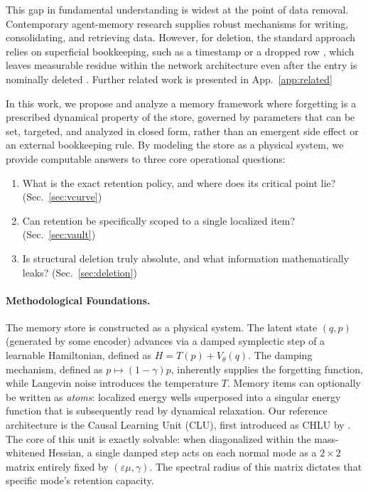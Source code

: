 \documentclass{article}
\begin{document}
This gap in fundamental understanding is widest at the point of data removal. Contemporary agent-memory research supplies robust mechanisms for writing, consolidating, and retrieving data. However, for deletion, the standard approach relies on superficial bookkeeping, such as a timestamp or a dropped row \citep{rasmussen_zep_2025,chhikara_mem0_2025}, which leaves measurable residue within the network architecture even after the entry is nominally deleted \citep{chakraborttii_ghost_2026,wang_memleak_2026}. Further related work is presented in App.~\ref{app:related}

In this work, we propose and analyze a memory framework where forgetting is a prescribed dynamical property of the store, governed by parameters that can be set, targeted, and analyzed in closed form, rather than an emergent side effect or an external bookkeeping rule. By modeling the store as a physical system, we provide computable answers to three core operational questions:
\begin{enumerate}
    \item What is the exact retention policy, and where does its critical point lie? (Sec.~\ref{sec:vcurve})
    \item Can retention be specifically scoped to a single localized item? (Sec.~\ref{sec:vault})
    \item Is structural deletion truly absolute, and what information mathematically leaks? (Sec.~\ref{sec:deletion})
\end{enumerate}

\paragraph{Methodological Foundations.}
The memory store is constructed as a physical system. The latent state $(q,p)$ (generated by some encoder) advances via a damped symplectic step of a learnable Hamiltonian, defined as $H=T(p)+V_\theta(q)$. The damping mechanism, defined as $p\mapsto(1-\gamma)p$, inherently supplies the forgetting function, while Langevin noise introduces the temperature $T$. Memory items can optionally be written as \emph{atoms}: localized energy wells superposed into a singular energy function that is subsequently read by dynamical relaxation. Our reference architecture is the Causal Learning Unit (CLU), first introduced as CHLU by \citet{jawahar_chlu_2026}. The core of this unit is exactly solvable: when diagonalized within the mass-whitened Hessian, a single damped step acts on each normal mode as a $2\times2$ matrix entirely fixed by $(\varepsilon\mu,\gamma)$. The spectral radius of this matrix dictates that specific mode's retention capacity.
\end{document}
